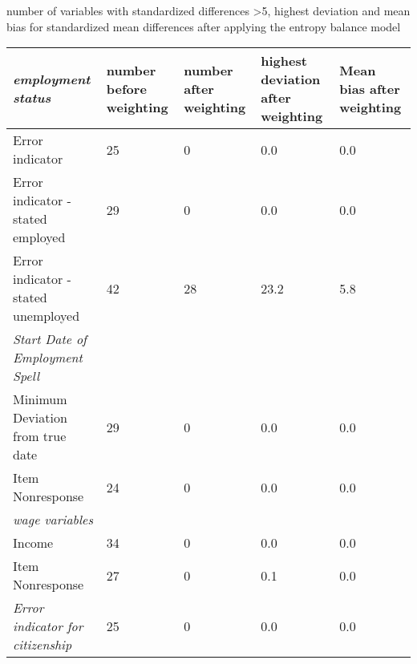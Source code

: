 \newpage
\begin{threeparttable}
\caption{number of variables with standardized differences \textgreater 5, highest deviation and mean bias for standardized mean differences after applying the entropy balance model}
\label{tab:achieved_balance}
\begin{tabular}{p{5cm}p{1.5cm}p{1.5cm}p{1.5cm}p{1.5cm}} 
\cmidrule(r{0.25em}){2-5} 		
\textit{employment status} &	number before weighting	&	number after weighting	&	highest deviation after weighting	&	Mean bias after weighting \\	
\midrule
Error indicator	&	25	&	0	&	0.0	&	0.0	\\
Error indicator - stated employed	&	29	&	0	&	0.0	&	0.0		\\
Error indicator - stated unemployed	&	42	&	28	&	23.2	&	5.8	\\
\addlinespace
\textit{Start Date of Employment Spell}	\\
Minimum Deviation from true date	&	29	&	0	&	0.0	&	0.0	\\
Item Nonresponse	&	24	&	0	&	0.0	&	0.0	\\
\addlinespace
\textit{wage variables}	\\
Income	&	34	&	0	&	0.0	&	0.0	 \\
Item Nonresponse	&	27	&	0	&	0.1	&	0.0	\\
\textit{Error indicator for citizenship}	&	25	&	0	&	0.0	&	0.0 \\
\end{tabular}
\vspace{.5em}
    \begin{tablenotes}\small

    \end{tablenotes}
\end{threeparttable}


